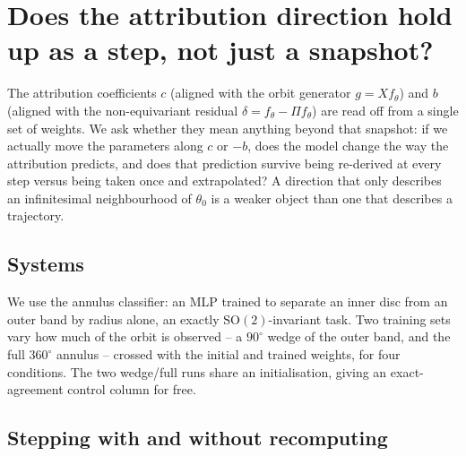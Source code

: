 \section{Does the attribution direction hold up as a step, not just a snapshot?}
\label{sec:equivariance-flow}

The attribution coefficients $c$ (aligned with the orbit generator $g=Xf_\theta$)
and $b$ (aligned with the non-equivariant residual $\delta=f_\theta-\Pi f_\theta$)
are read off from a single set of weights. We ask whether they mean anything
beyond that snapshot: if we actually move the parameters along $c$ or $-b$,
does the model change the way the attribution predicts, and does that
prediction survive being re-derived at every step versus being taken once and
extrapolated? A direction that only describes an infinitesimal neighbourhood
of $\theta_0$ is a weaker object than one that describes a trajectory.

\subsection{Systems}
\label{sec:equivariance-flow-systems}

We use the annulus classifier: an MLP trained to separate an inner disc from
an outer band by radius alone, an exactly $\mathrm{SO}(2)$-invariant task. Two
training sets vary how much of the orbit is observed -- a $90^\circ$ wedge of
the outer band, and the full $360^\circ$ annulus -- crossed with the
initial and trained weights, for four conditions. The two wedge/full runs
share an initialisation, giving an exact-agreement control column for free.

\subsection{Stepping with and without recomputing}
\label{sec:equivariance-flow-method}

